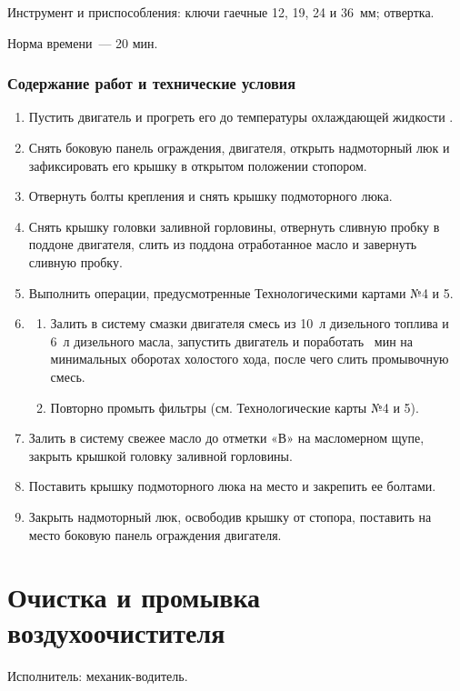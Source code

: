 Инструмент и приспособления: ключи гаечные 12, 19, 24 и 36~мм; отвертка. 

Норма времени~--- 20 мин. 

\subsubsection{Содержание работ и технические условия}

\begin{enumerate}
    \item Пустить двигатель и прогреть его до температуры охлаждающей жидкости . 
    \item Снять боковую панель ограждения, двигателя, открыть надмоторный люк и зафиксировать его крышку в открытом положении стопором. 
    \item Отвернуть болты крепления и снять крышку подмоторного люка. 
    \item Снять крышку головки заливной горловины, отвернуть сливную пробку в поддоне двигателя, слить из поддона отработанное масло и завернуть сливную пробку. 
    \item Выполнить операции, предусмотренные Технологическими картами №4 и 5. 
    \item \begin{enumerate}
        \item Залить в систему смазки двигателя смесь из 10~л дизельного топлива и 6~л дизельного масла, запустить двигатель и поработать ~мин на минимальных оборотах холостого хода, после чего слить промывочную смесь. 
        \item Повторно промыть фильтры (см. Технологические карты №4 и 5). 
    \end{enumerate}
    \item Залить в систему свежее масло до отметки «В» на масломерном щупе, закрыть крышкой головку заливной горловины. 
    \item Поставить крышку подмоторного люка на место и закрепить ее болтами. 
    \item Закрыть надмоторный люк, освободив крышку от стопора, поставить на место боковую панель ограждения двигателя. 
\end{enumerate}

\section{Очистка и промывка воздухоочистителя}
Исполнитель: механик-водитель. 

